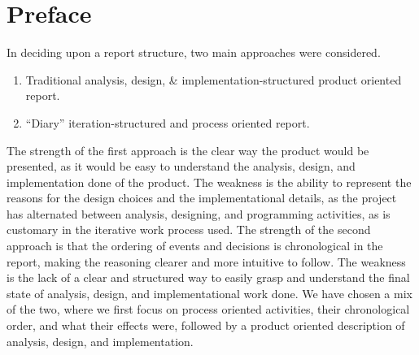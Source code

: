 
\begingroup
\let\clearpage\relax
\let\cleardoublepage\relax
\let\cleardoublepage\relax

\section*{Preface} %

\label{report_structure}

In deciding upon a report structure, two main approaches were considered.

\begin{enumerate}
	\item Traditional analysis, design, \& implementation-structured product oriented report.
	\item ``Diary'' iteration-structured and process oriented report.
\end{enumerate}

The strength of the first approach is the clear way the product would be presented, as it would be easy to understand the analysis, design, and implementation done of the product. 
The weakness is the ability to represent the reasons for the design choices and the implementational details, as the project has alternated between analysis, designing, and programming activities, as is customary in the iterative work process used. \newline
The strength of the second approach is that the ordering of events and decisions is chronological in the report, making the reasoning clearer and more intuitive to follow. 
The weakness is the lack of a clear and structured way to easily grasp and understand the final state of analysis, design, and implementational work done. \newline
We have chosen a mix of the two, where we first focus on process oriented activities, their chronological order, and what their effects were, followed by a product oriented description of analysis, design, and implementation.





